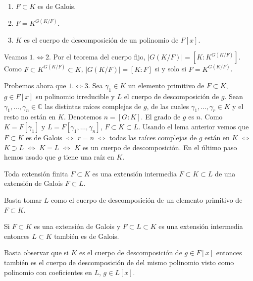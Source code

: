 \begin{enumerate}
\def\labelenumi{\arabic{enumi}.}
\tightlist
\item
  \(F\subset K\) es de Galois.
\item
  \(F=K^{G(K/F)}\).
\item
  \(K\) es el cuerpo de descomposición de un polinomio de \(F[x]\).
\end{enumerate}



Veamos \(1.\Leftrightarrow 2.\) Por el teorema del cuerpo fijo,
\(|G(K/F)|=[K:K^{G(K/F)}]\). Como \(F\subset K^{G(K/F)}\subset K\),
\(|G(K/F)|=[K:F]\) si y solo si \(F=K^{G(K/F)}\).

Probemos ahora que \(1.\Leftrightarrow 3.\) Sea \(\gamma_1\in K\) un
elemento primitivo de \(F\subset K\), \(g\in F[x]\) su polinomio
irreducible y \(L\) el cuerpo de descomposición de \(g\). Sean
\(\gamma_1,\dots,\gamma_n\in \mathbb{C}\) las distintas raíces
complejas de \(g\), de las cuales \(\gamma_1,\dots,\gamma_r\in K\) y
el resto no están en \(K\). Denotemos \(n=[G:K]\). El grado de \(g\) es
\(n\). Como \(K=F[\gamma_1]\) y \(L=F[\gamma_1,\dots,\gamma_n]\),
\(F\subset K\subset L\). Usando el lema anterior vemos que
\(F\subset K\) es de Galois \(\Leftrightarrow\) \(r=n\)
\(\Leftrightarrow\) todas las raíces complejas de \(g\) están en \(K\)
\(\Leftrightarrow\) \(K\supset L\) \(\Leftrightarrow\) \(K=L\)
\(\Leftrightarrow\) \(K\) es un cuerpo de descomposición. En el último
paso hemos usado que \(g\) tiene una raíz en \(K\). 


Toda extensión finita \(F\subset K\) es una extensión intermedia
\(F\subset K\subset L\) de una extensión de Galois \(F\subset L\).


Basta tomar \(L\) como el cuerpo de descomposición de un elemento
primitivo de \(F\subset K\). 


Si \(F\subset K\) es una extensión de Galois y \(F\subset L\subset K\)
es una extensión intermedia entonces \(L\subset K\) también es de
Galois. 


Basta observar que si \(K\) es el cuerpo de descomposición de
\(g\in F[x]\) entonces también es el cuerpo de descomposición de del
mismo polinomio visto como polinomio con coeficientes en \(L\),
\(g\in L[x]\). 

